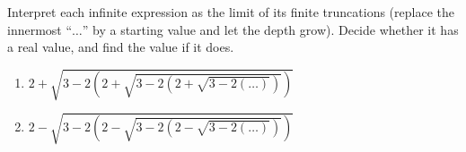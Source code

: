 Interpret each infinite expression as the limit of its finite truncations (replace the innermost ``$\ldots$'' by a starting value and let the depth grow). Decide whether it has a real value, and find the value if it does.
\begin{enumerate}
\item[(a)] $2+\sqrt{3-2\left(2+\sqrt{3-2\left(2+\sqrt{3-2(\ldots)}\right)}\right)}$
\item[(b)] $2-\sqrt{3-2\left(2-\sqrt{3-2\left(2-\sqrt{3-2(\ldots)}\right)}\right)}$
\end{enumerate}
